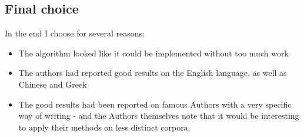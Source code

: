 \subsection{Final choice}

In the end I choose \cite{nr4} for several reasons:
\begin{itemize}
\item The algorithm looked like it could be implemented without too much work
\item The authors had reported good results on the English language, as well as Chinese and Greek
\item The good results had been reported on famous Authors with a very specific way of writing - and the Authors themselves note that it would be interesting to apply their methods on less distinct corpora. 
\end{itemize}
